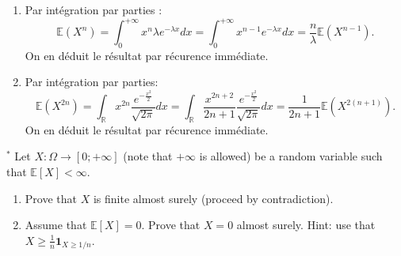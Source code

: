 \begin{solution}
  \begin{enumerate}
    \item Par int\'{e}gration par parties :
          \[
            \mathbb{E}\left(X^{n}\right) = \int_{0}^{+\infty}x^{n}\lambda e^{-\lambda x}dx = \int_{0}^{+\infty}x^{n-1} e^{-\lambda x}dx = \frac{n}{\lambda}\mathbb{E}\left(X^{n-1}\right).
          \]
          On en d\'{e}duit le r\'{e}sultat par r\'{e}curence imm\'{e}diate.
    \item Par int\'{e}gration par parties:
          \[
            \mathbb{E}\left(X^{2n}\right) = \int_{\mathbb{R}}x^{2n}\frac{e^{-\frac{x^2}{2}}}{\sqrt{2\pi}}dx = \int_{\mathbb{R}}\frac{x^{2n+2}}{2n + 1}\frac{e^{-\frac{x^2}{2}}}{\sqrt{2\pi}}dx = \frac{1}{2n+1}\mathbb{E}\left(X^{2(n+1)}\right).
          \]
          On en d\'{e}duit le r\'{e}sultat par r\'{e}curence imm\'{e}diate.
  \end{enumerate}
\end{solution}

\begin{Exercise}
  ${ }^{*}$ Let $X: \Omega \rightarrow[0 ;+\infty]$ (note that $+\infty$ is allowed) be a random variable such that $\mathbb{E}[X]<\infty$.

  \begin{enumerate}
    \item Prove that $X$ is finite almost surely (proceed by contradiction).

    \item Assume that $\mathbb{E}[X]=0$. Prove that $X=0$ almost surely. Hint: use that $X \geq \frac{1}{n} \mathbf{1}_{X \geq 1 / n}$.
  \end{enumerate}
\end{Exercise}
